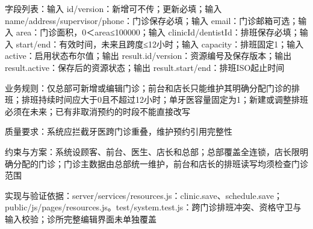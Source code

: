 \documentclass[UTF8,12pt,a4paper,fontset=none]{ctexart}
\begin{document}
字段列表：输入 id/\allowbreak{}version：新增可不传；更新必填；输入 name/\allowbreak{}address/\allowbreak{}supervisor/\allowbreak{}phone：门诊保存必填；输入 email：门诊邮箱可选；输入 area：门诊面积，0＜area≤100000；输入 clinicId/\allowbreak{}dentistId：排班保存必填；输入 start/\allowbreak{}end：有效时间，未来且跨度≤12小时；输入 capacity：排班固定1；输入 active：启用状态布尔值；输出 result.\allowbreak{}id/\allowbreak{}version：资源编号及保存版本；输出 result.\allowbreak{}active：保存后的资源状态；输出 result.\allowbreak{}start/\allowbreak{}end：排班ISO起止时间\par
业务规则：仅总部可新增或编辑门诊；前台和店长只能维护其明确分配门诊的排班；排班持续时间应大于0且不超过12小时；单牙医容量固定为1；新建或调整排班必须在未来；已有非取消预约的时段不能直接改写\par
质量要求：系统应拦截牙医跨门诊重叠，维护预约引用完整性\par
约束与方案：系统设顾客、前台、医生、店长和总部；总部覆盖全连锁，店长限明确分配的门诊；门诊主数据由总部统一维护，前台和店长的排班读写均须检查门诊范围\par
实现与验证依据：server/\allowbreak{}services/\allowbreak{}resources.\allowbreak{}js：clinic.\allowbreak{}save、schedule.\allowbreak{}save；public/\allowbreak{}js/\allowbreak{}pages/\allowbreak{}resources.\allowbreak{}js。test/\allowbreak{}system.\allowbreak{}test.\allowbreak{}js：跨门诊排班冲突、资格守卫与输入校验；诊所完整编辑界面未单独覆盖\par
{}
\end{document}
